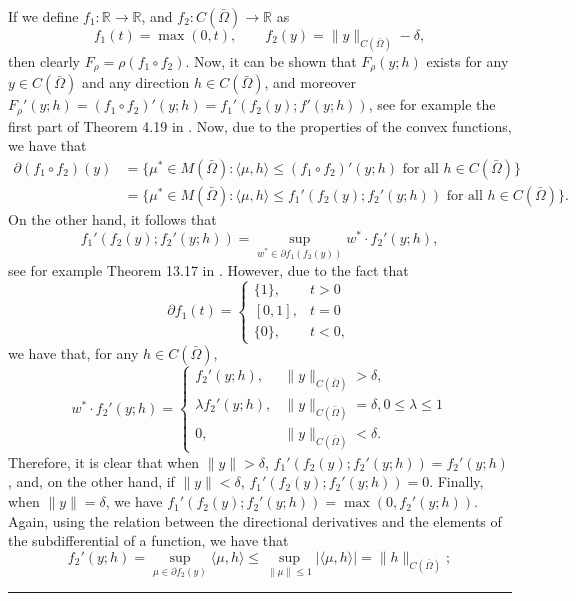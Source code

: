 \documentclass[11pt,a4paper]{amsart}
\newcommand{\kw}{\rule{2mm}{2mm}}
\renewcommand{\l}{\left}
\renewcommand{\r}{\right}
\newcommand{\om}{\Omega}
\renewenvironment{proof}{{Proof.}}{\hfill\kw}
\newcommand{\norm}[1]{\lVert #1 \rVert}
\begin{document}
\begin{proof}
    If we define $f_1:\mathbb{R}\to \mathbb{R}$, and $f_2:C(\bar \om)\to \mathbb{R}$ as
    \[
    f_1(t)=\max(0,t),\qquad f_2(y)=\norm{y}_{C(\bar \om)}-\delta,
    \]
    then clearly $F_{\rho}=\rho \l(f_1\circ f_2\r)$. Now, it can be shown that $F_{\rho}(y;h)$ exists for any $y\in C(\bar \om)$ and any direction $h\in C(\bar \om)$, and moreover $F_{\rho}'(y;h)=(f_1\circ f_2)'(y;h)=f_1'(f_2(y);f'(y;h))$, see for example the first part of Theorem 4.19 in \cite{clason-valk}. Now, due to the properties of the convex functions, we have that
    \begin{equation}\label{eq:lemma_1_1}   
    \begin{split}
        \partial (f_1\circ f_2)(y)&=\{\mu^*\in M(\bar\om): \langle \mu, h \rangle\le (f_1\circ f_2)'(y;h)\mbox{ for all }h\in C(\bar \om) \}\\
        &=\{\mu^*\in M(\bar\om): \langle \mu, h \rangle\le f_1'(f_2(y);f_2'(y;h))\mbox{ for all }h\in C(\bar \om)\}.
    \end{split}
    \end{equation}
    On the other hand, it follows that
    \[    f_1'(f_2(y);f_2'(y;h))=\sup_{w^*\in \partial f_1(f_2(y))} w^*\cdot f_2'(y;h),
    \]
    see for example Theorem 13.17 in \cite{clason-valk}. However, due to the fact that
    \[
    \partial f_1(t)=\begin{cases}
        \{1\},&t>0\\
        [0,1],&t=0\\
        \{0\},&t<0,
    \end{cases}
    \]
    we have that, for any $h\in C(\bar\om)$, 
    \[
    w^*\cdot f_2'(y;h)=\begin{cases}
        f_2'(y;h),& \norm{y}_{C(\bar\om)}>\delta,\\
        \lambda f_2'(y;h), &\norm{y}_{C(\bar\om)}=\delta, 0\le \lambda\le 1\\
        0, &\norm{y}_{C(\bar\om)}<\delta.
    \end{cases}
    \]
    Therefore, it is clear that when $\norm{y}>\delta$, $f_1'(f_2(y);f_2'(y;h))=f_2'(y;h)$, and, on the other hand, if $\norm{y}<\delta$, $f_1'(f_2(y);f_2'(y;h))=0$. Finally, when $\norm{y}=\delta$, we have $f_1'(f_2(y);f_2'(y;h))=\max(0,f_2'(y;h))$. Again, using the relation between the directional derivatives and the elements of the subdifferential of a function, we have that 
    \[
    f_2'(y;h)=\sup_{\mu\in \partial f_2(y)}\langle \mu,h\rangle\le \sup_{\norm{\mu}\le 1}|\langle \mu,h\rangle|=\norm{h}_{C(\bar\om)};
\]
\end{proof}
\end{document}
